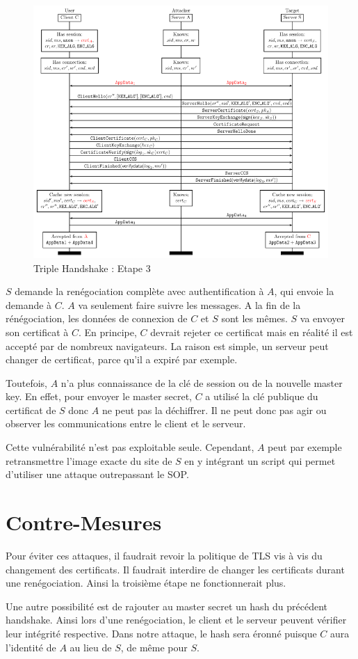 \begin{figure}[h]
\label{fig:hand3}
\centering
\includegraphics[scale=0.4]{Hand3}
\caption{Triple Handshake : Etape 3 }
\end{figure}

$S$ demande la renégociation complète avec authentification à $A$, qui envoie la demande à $C$. $A$ va seulement faire suivre les messages. A la
fin de la rénégociation, les données de connexion de $C$ et $S$ sont les mêmes. $S$ va envoyer son certificat à $C$.
En principe, $C$ devrait rejeter ce certificat mais en réalité il est accepté par de nombreux navigateurs. La raison
est simple, un serveur peut changer de certificat, parce qu'il a expiré par exemple.

Toutefois, $A$ n'a plus connaissance de la clé de session ou de la nouvelle master key. En effet, pour envoyer
le master secret, $C$ a utilisé la clé publique du certificat de $S$ donc $A$ ne peut pas la déchiffrer.
 Il ne peut donc pas agir ou observer les communications entre le client et le serveur. 

Cette vulnérabilité n'est pas exploitable seule. Cependant, $A$ peut par exemple retransmettre l'image exacte du site de $S$ en
y intégrant un script qui permet d'utiliser une attaque outrepassant le SOP.


\section{Contre-Mesures}
\label{sec:cmTHR}

Pour éviter ces attaques, il faudrait revoir la politique de TLS vis à vis du changement des certificats.
Il faudrait interdire de changer les certificats durant une renégociation. Ainsi la troisième étape ne 
fonctionnerait plus.

Une autre possibilité est de rajouter au master secret un hash du précédent handshake. Ainsi lors d'une
renégociation, le client et le serveur peuvent vérifier leur intégrité respective. Dans notre attaque, 
le hash sera éronné puisque $C$ aura l'identité de $A$ au lieu de $S$, de même pour $S$.

 

